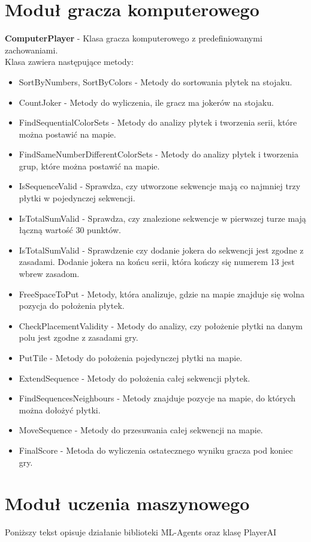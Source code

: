 \documentclass[a4paper,twoside,12pt]{book}
\begin{document}
	\section{Moduł gracza komputerowego}
	\textbf{	ComputerPlayer} - Klasa gracza komputerowego z predefiniowanymi zachowaniami.\\ Klasa zawiera następujące metody:
		\begin{itemize}
			\item SortByNumbers, SortByColors - Metody do sortowania płytek na stojaku.
			\item CountJoker - Metody do wyliczenia, ile gracz ma jokerów na stojaku.
			\item FindSequentialColorSets - Metody do analizy płytek i tworzenia serii, które można postawić na mapie.
			\item FindSameNumberDifferentColorSets - Metody do analizy płytek i tworzenia grup, które można postawić na mapie.
			\item IsSequenceValid - Sprawdza, czy utworzone sekwencje mają co najmniej trzy płytki w pojedynczej sekwencji.
			\item IsTotalSumValid - Sprawdza, czy znalezione sekwencje w pierwszej turze mają łączną wartość 30 punktów.
			\item IsTotalSumValid - Sprawdzenie czy dodanie jokera do sekwencji jest zgodne z zasadami. Dodanie jokera na końcu serii, która kończy się numerem 13 jest wbrew zasadom.
			\item FreeSpaceToPut - Metody, która analizuje, gdzie na mapie znajduje się wolna pozycja do położenia płytek. 
			\item CheckPlacementValidity - Metody do analizy, czy położenie płytki na danym polu jest zgodne z zasadami gry.
			\item PutTile - Metody do położenia pojedynczej płytki na mapie.
			\item ExtendSequence - Metody do położenia całej sekwencji płytek.
			\item FindSequencesNeighbours - Metody znajduje pozycje na mapie, do których można dołożyć płytki.
			\item MoveSequence - Metody do przesuwania całej sekwencji na mapie.
			\item FinalScore - Metoda do wyliczenia ostatecznego wyniku gracza pod koniec gry.
		\end{itemize}
		
	\section{Moduł uczenia maszynowego}
	Poniższy tekst opisuje działanie biblioteki ML-Agents oraz klasę PlayerAI
\end{document}
